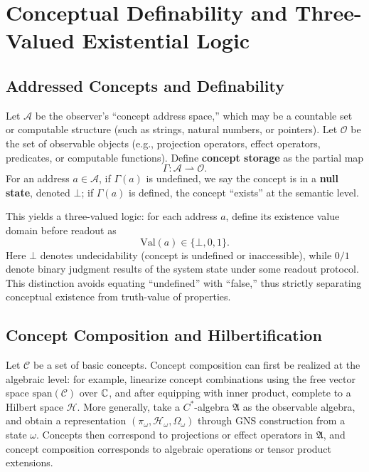 \section{Conceptual Definability and Three-Valued Existential Logic}

\subsection{Addressed Concepts and Definability}

Let $\mathcal{A}$ be the observer's ``concept address space,'' which may be a countable set or computable structure (such as strings, natural numbers, or pointers). Let $\mathcal{O}$ be the set of observable objects (e.g., projection operators, effect operators, predicates, or computable functions). Define \textbf{concept storage} as the partial map
\[
\Gamma:\mathcal{A}\rightharpoonup \mathcal{O}.
\]
For an address $a\in\mathcal{A}$, if $\Gamma(a)$ is undefined, we say the concept is in a \textbf{null state}, denoted $\bot$; if $\Gamma(a)$ is defined, the concept ``exists'' at the semantic level.

This yields a three-valued logic: for each address $a$, define its existence value domain before readout as
\[
\mathrm{Val}(a)\in\{\bot,0,1\}.
\]
Here $\bot$ denotes undecidability (concept is undefined or inaccessible), while $0/1$ denote binary judgment results of the system state under some readout protocol. This distinction avoids equating ``undefined'' with ``false,'' thus strictly separating conceptual existence from truth-value of properties.

\subsection{Concept Composition and Hilbertification}

Let $\mathcal{C}$ be a set of basic concepts. Concept composition can first be realized at the algebraic level: for example, linearize concept combinations using the free vector space $\mathrm{span}(\mathcal{C})$ over $\mathbb{C}$, and after equipping with inner product, complete to a Hilbert space $\mathcal{H}$. More generally, take a $C^*$-algebra $\mathfrak{A}$ as the observable algebra, and obtain a representation $(\pi_\omega,\mathcal{H}_\omega,\Omega_\omega)$ through GNS construction from a state $\omega$. Concepts then correspond to projections or effect operators in $\mathfrak{A}$, and concept composition corresponds to algebraic operations or tensor product extensions.

